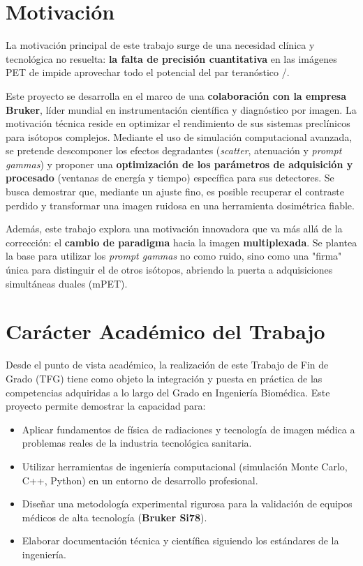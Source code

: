 \section{Motivación}
\label{sec:introduccion:motivacion}

La motivación principal de este trabajo surge de una necesidad clínica y tecnológica no resuelta: \textbf{la falta de precisión
    cuantitativa} en las imágenes PET de \yochoseis impide aprovechar todo el potencial del par teranóstico \yochoseis/\ynuevecero.

Este proyecto se desarrolla en el marco de una \textbf{colaboración con la empresa Bruker}, líder mundial en instrumentación científica y
diagnóstico por imagen. La motivación técnica reside en optimizar el rendimiento de sus sistemas preclínicos para isótopos complejos.
Mediante el uso de simulación computacional avanzada, se pretende descomponer los efectos degradantes (\emph{scatter}, atenuación y \emph{prompt gammas})
y proponer una \textbf{optimización de los parámetros de adquisición y procesado} (ventanas de energía y tiempo) específica para sus detectores.
Se busca demostrar que, mediante un ajuste fino, es posible recuperar el contraste perdido y transformar una imagen ruidosa en una
herramienta dosimétrica fiable.

Además, este trabajo explora una motivación innovadora que va más allá de la corrección: el \textbf{cambio de paradigma} hacia la imagen
\textbf{multiplexada}. Se plantea la base para utilizar los \emph{prompt gammas} no como ruido, sino como una
"firma" única para distinguir el \yochoseis de otros isótopos, abriendo la puerta a adquisiciones simultáneas duales (mPET).

\section{Carácter Académico del Trabajo}
\label{sec:introduccion:caracter}

Desde el punto de vista académico, la realización de este Trabajo de Fin de Grado (TFG) tiene como objeto la integración y
puesta en práctica de las competencias adquiridas a lo largo del Grado en Ingeniería Biomédica. Este proyecto permite demostrar
la capacidad para:

\begin{itemize}
    \item Aplicar fundamentos de física de radiaciones y tecnología de imagen médica a problemas reales de la industria tecnológica sanitaria.
    \item Utilizar herramientas de ingeniería computacional (simulación Monte Carlo, C++, Python) en un entorno de desarrollo profesional.
    \item Diseñar una metodología experimental rigurosa para la validación de equipos médicos de alta tecnología (\textbf{Bruker Si78}).
    \item Elaborar documentación técnica y científica siguiendo los estándares de la ingeniería.
\end{itemize}

